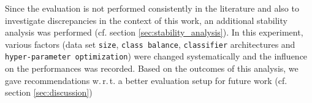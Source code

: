 Since the evaluation is not performed consistently in the literature and also to investigate discrepancies in the context of this work, an additional stability analysis was performed (cf. section \vref{sec:stability_analysis}). In this experiment, various factors (data set \texttt{size}, \texttt{class balance}, \texttt{classifier} architectures and \texttt{hyper-parameter optimization}) were changed systematically and the influence on the performances was recorded. Based on the outcomes of this analysis, we gave recommendations w.\,r.\,t. a better evaluation setup for future work (cf. section \vref{sec:discussion})
